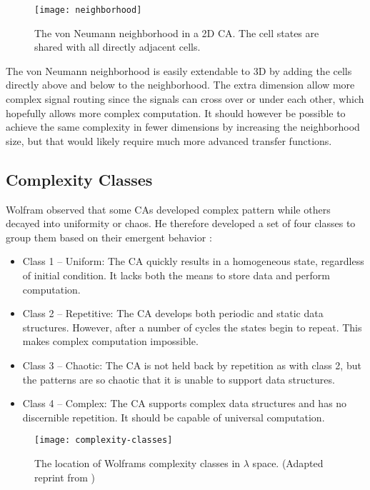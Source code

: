 \begin{figure}[!ht]
    \centering
    \texttt{[image: neighborhood]}
    \caption[von Neumann neighborhood]{
        The von Neumann neighborhood in a 2D CA.
        The cell states are shared with all directly adjacent cells.
    }
    \label{fig:neighborhood}
\end{figure}

The von Neumann neighborhood is easily extendable to 3D by adding the cells directly above and below to the neighborhood.
The extra dimension allow more complex signal routing since the signals can cross over or under each other, which hopefully allows more complex computation.
It should however be possible to achieve the same complexity in fewer dimensions by increasing the neighborhood size, but that would likely require much more advanced transfer functions.

\subsection{Complexity Classes}

Wolfram observed that some CAs developed complex pattern while others decayed into uniformity or chaos.
He therefore developed a set of four classes to group them based on their emergent behavior \cite{wolfram1984complexity}:

\begin{itemize}
    \item Class 1 – Uniform:
        The CA quickly results in a homogeneous state, regardless of initial condition.
        It lacks both the means to store data and perform computation.
    \item Class 2 – Repetitive:
        The CA develops both periodic and static data structures.
        However, after a number of cycles the states begin to repeat.
        This makes complex computation impossible.
    \item Class 3 – Chaotic:
        The CA is not held back by repetition as with class 2, but the patterns are so chaotic that it is unable to support data structures.
    \item Class 4 – Complex:
        The CA supports complex data structures and has no discernible repetition.
        It should be capable of universal computation.
\end{itemize}

\begin{figure}[!ht]
    \centering
    \texttt{[image: complexity-classes]}
    \caption[Complexity classes]{
        The location of Wolframs complexity classes in $\lambda$ space.
        (Adapted reprint from \cite{langton1990edgeofchaos})
    }
    \label{fig:complexity-classes}
\end{figure}

